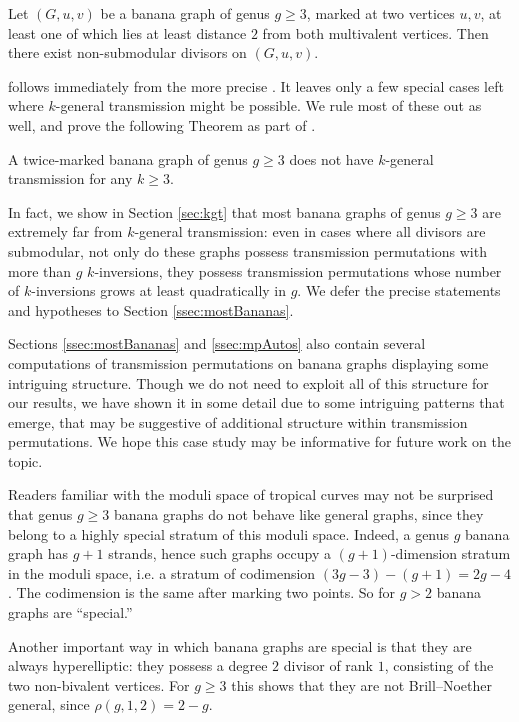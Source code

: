 \begin{theorem} \label{thm:bananaSimple}
Let $(G,u,v)$ be a banana graph of genus $g \geq 3$, marked at two vertices $u,v$, at least one of which lies at least distance $2$ from both multivalent vertices. Then there exist non-submodular divisors on $(G,u,v)$.
\end{theorem}

 follows immediately from the more precise . It leaves only a few special cases left where $k$-general transmission might be possible. We rule most of these out as well, and prove the following Theorem as part of .

\begin{theorem}\label{thm:bananas}
    A twice-marked banana graph of genus $g \geq 3$ does not have $k$-general transmission for any $k\geq 3$.
\end{theorem}

In fact, we show in Section \ref{sec:kgt} that most banana graphs of genus $g \geq 3$ are extremely far from $k$-general transmission: even in cases where all divisors are submodular, not only do these graphs possess transmission permutations with more than $g$ $k$-inversions, they possess transmission permutations whose number of $k$-inversions grows at least quadratically in $g$. We defer the precise statements and hypotheses to Section \ref{ssec:mostBananas}.

Sections \ref{ssec:mostBananas} and \ref{ssec:mpAutos} also contain several computations of transmission permutations on banana graphs displaying some intriguing structure. Though we do not need to exploit all of this structure for our results, we have shown it in some detail due to some intriguing patterns that emerge, that may be suggestive of additional structure within transmission permutations. We hope this case study may be informative for future work on the topic.

\begin{rema}
Readers familiar with the moduli space of tropical curves may not be surprised that genus $g \geq 3$ banana graphs do not behave like general graphs, since they belong to a highly special stratum of this moduli space. Indeed, a genus $g$ banana graph has $g+1$ strands, hence such graphs occupy a $(g+1)$-dimension stratum in the moduli space, i.e. a stratum of codimension $(3g-3) -(g+1) = 2g-4$. The codimension is the same after marking two points. So for $g > 2$ banana graphs are ``special.''

Another important way in which banana graphs are special is that they are always hyperelliptic: they possess a degree $2$ divisor of rank $1$, consisting of the two non-bivalent vertices. For $g \geq 3$ this shows that they are not Brill--Noether general, since $\rho(g,1,2) = 2-g$.
\end{rema}

